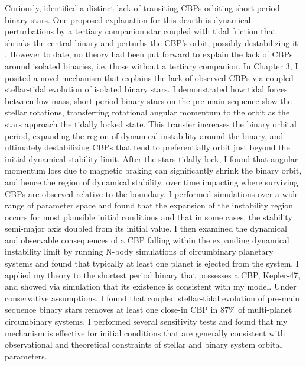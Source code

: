 Curiously, \kepler identified a distinct lack of transiting CBPs orbiting short period binary stars. One proposed explanation for this dearth is dynamical perturbations by a tertiary companion star coupled with tidal friction that shrinks the central binary and perturbs the CBP's orbit, possibly destabilizing it \citep{Munoz2015,Martin2015b,Hamers2016}.  However to date, no theory had been put forward to explain the lack of CBPs around isolated binaries, i.e. those without a tertiary companion. In Chapter 3, I posited a novel mechanism that explains the lack of observed CBPs via coupled stellar-tidal evolution of isolated binary stars. I demonstrated how tidal forces between low-mass, short-period binary stars on the pre-main sequence slow the stellar rotations, transferring rotational angular momentum to the orbit as the stars approach the tidally locked state.  This transfer increases the binary orbital period, expanding the region of dynamical instability around the binary, and ultimately destabilizing CBPs that tend to preferentially orbit just beyond the initial dynamical stability limit.  After the stars tidally lock, I found that angular momentum loss due to magnetic braking can significantly shrink the binary orbit, and hence the region of dynamical stability, over time impacting where surviving CBPs are observed relative to the boundary.  I performed simulations over a wide range of parameter space and found that the expansion of the instability region occurs for most plausible initial conditions and that in some cases, the stability semi-major axis doubled from its initial value.  I then examined the dynamical and observable consequences of a CBP falling within the expanding dynamical instability limit by running N-body simulations of circumbinary planetary systems and found that typically at least one planet is ejected from the system.  I applied my theory to the shortest period \kepler binary that possesses a CBP, Kepler-47, and showed via simulation that its existence is consistent with my model.  Under conservative assumptions, I found that coupled stellar-tidal evolution of pre-main sequence binary stars removes at least one close-in CBP in $87\%$ of multi-planet circumbinary systems. I performed several sensitivity tests and found that my mechanism is effective for initial conditions that are generally consistent with observational and theoretical constraints of stellar and binary system orbital parameters. 

